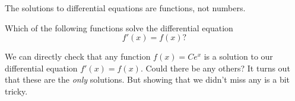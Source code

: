 \documentclass{ximera}
\begin{document}
The solutions to differential equations are functions, not numbers.
\begin{question}
	Which of the following functions solve the differential equation
	\[
	f'(x) = f(x)?
	\]
	\begin{selectAll}
	\end{selectAll}
\end{question}
\begin{remark}
	We can directly check that any function $f(x)=Ce^x$ is a solution to our differential equation $f'(x)=f(x)$. Could there be any others? It turns out that these are the \textit{only} solutions. But showing that we didn't miss any is a bit tricky.
%			
\end{remark}
\end{document}
